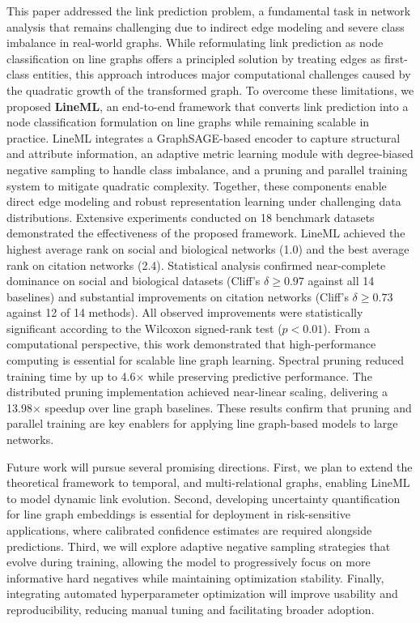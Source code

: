 \documentclass[pdflatex,sn-mathphys-num]{sn-jnl}%
\theoremstyle{thmstyleone}%
\theoremstyle{thmstyletwo}%
\theoremstyle{thmstylethree}%
\theoremstyle{plain} %
\theoremstyle{definition} %
\theoremstyle{remark} %
\theoremstyle{plain} %
\begin{document}
This paper addressed the link prediction problem, a fundamental task in network analysis that remains challenging due to indirect edge modeling and severe class imbalance in real-world graphs. 
While reformulating link prediction as node classification on line graphs offers a principled solution by treating edges as first-class entities, this approach introduces major computational challenges caused by the quadratic growth of the transformed graph. 
To overcome these limitations, we proposed \textbf{LineML}, an end-to-end framework that converts link prediction into a node classification formulation on line graphs while remaining scalable in practice. 
LineML integrates a GraphSAGE-based encoder to capture structural and attribute information, an adaptive metric learning module with degree-biased negative sampling to handle class imbalance, and a pruning and parallel training system to mitigate quadratic complexity. 
Together, these components enable direct edge modeling and robust representation learning under challenging data distributions.
Extensive experiments conducted on 18 benchmark datasets demonstrated the effectiveness of the proposed framework. 
LineML achieved the highest average rank on social and biological networks (1.0) and the best average rank on citation networks (2.4). 
Statistical analysis confirmed near-complete dominance on social and biological datasets (Cliff’s $\delta \geq 0.97$ against all 14 baselines) and substantial improvements on citation networks (Cliff’s $\delta \geq 0.73$ against 12 of 14 methods). 
All observed improvements were statistically significant according to the Wilcoxon signed-rank test ($p < 0.01$).
From a computational perspective, this work demonstrated that high-performance computing is essential for scalable line graph learning. 
Spectral pruning reduced training time by up to 4.6$\times$ while preserving predictive performance.
The distributed pruning implementation achieved near-linear scaling, delivering a 13.98$\times$ speedup over line graph baselines.
These results confirm that pruning and parallel training are key enablers for applying line graph-based models to large networks.

Future work will pursue several promising directions. 
First, we plan to extend the theoretical framework to temporal, and multi-relational graphs, enabling LineML to model dynamic link evolution. 
Second, developing uncertainty quantification for line graph embeddings is essential for deployment in risk-sensitive applications, where calibrated confidence estimates are required alongside predictions. 
Third, we will explore adaptive negative sampling strategies that evolve during training, allowing the model to progressively focus on more informative hard negatives while maintaining optimization stability. 
Finally, integrating automated hyperparameter optimization will improve usability and reproducibility, reducing manual tuning and facilitating broader adoption.
\end{document}
